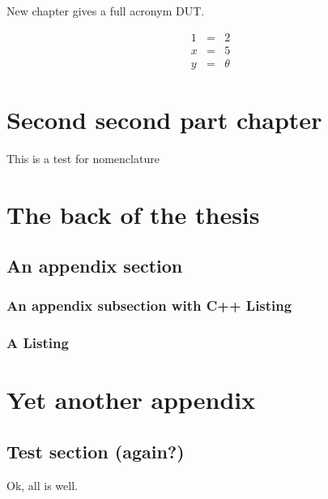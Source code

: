 \documentclass[a4paper,11pt]{mscThesis}
\begin{document}
New chapter gives a full acronym \ac{DUT}.

\begin{eqnarray}
  1 &=& 2\\
  x &=& 5 \\
  y &=& \theta
\end{eqnarray}

    \chapter{Second second part chapter}

    This is a test for nomenclature 
%
%
    


\appendix

    \chapter{The back of the thesis}

    \section{An appendix section}

    \subsection{An appendix subsection with C++ Listing}

    \lstset{language=C++}
    

    \subsection{A \matlab Listing}

    \lstset{language=matlab}
    

    \chapter{Yet another appendix}

    \section{Test section (again?)}

    Ok, all is well.
\end{document}
